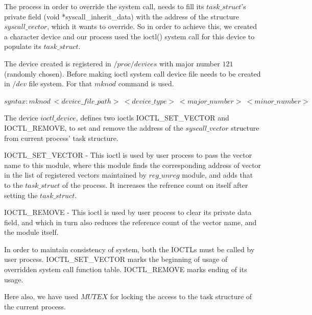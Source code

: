 \documentclass[11pt]{article}
\begin{document}
The process in order to override the system call, needs to fill its $task\_struct$'s private field (void *syscall\_inherit\_data)
with the address of the structure $syscall\_vector$, which it wants to override. So in order to achieve this, we created
a character device and our process used the ioctl() system call for this device to populate its $task\_struct$. 

The device created is registered in $/proc/devices$ with major number $121$(randomly chosen). 
Before making ioctl system call device file needs to be created in $/dev$ file system.
For that $mknod$ command is used.
\begin{center}
$syntax : mknod  \ <device\_file\_path> \ <device\_type>\  <major\_number>\  <minor\_number>$
\end{center}

The device $ioctl\_device$, defines two ioctls IOCTL\_SET\_VECTOR and IOCTL\_REMOVE, to set and remove the address
of the $syscall\_vector$ structure from current process' task structure.

IOCTL\_SET\_VECTOR - This ioctl is used by user process to pass the vector name to this module, where this module finds the corresponding address of vector in the list of registered vectors maintained by $reg\_unreg$ module, and adds that to 
the $task\_struct$ of the process. It increases the refrence count on itself after setting the $task\_struct$.

IOCTL\_REMOVE - This ioctl is used by user process to clear its private data field, and which in turn also reduces the
reference count of the vector name, and the module itself.

In order to maintain consistency of system, both the IOCTLs must be called by user process.
IOCTL\_SET\_VECTOR marks the beginning of usage of overridden system call function table.
IOCTL\_REMOVE marks ending of its usage.

Here also, we have used $MUTEX$ for locking the access to the task structure of the current process.
\end{document}
